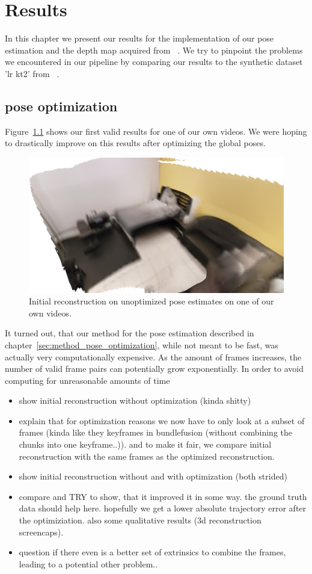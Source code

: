 \chapter{Results}
    In this chapter we present our results for the implementation of our pose estimation and the depth map acquired from ~\cite{luo2020consistent}.
    We try to pinpoint the problems we encountered in our pipeline by comparing our results to the synthetic dataset 'lr kt2' from ~\cite{handa:etal:ICRA2014}.
    \section{pose optimization}
        Figure~\ref{fig:initial_reconstruction} shows our first valid results for one of our own videos. We were hoping to drastically improve on this results after optimizing the global poses.
        \begin{figure}[ht]
            \centering
            \includegraphics[width=.6\textwidth]{images/initial_reconstruction.png}
            \caption{Initial reconstruction on unoptimized pose estimates on one of our own videos.}
            \label{fig:initial_reconstruction}
        \end{figure}
        It turned out, that our method for the pose estimation described in chapter~\ref{sec:method_pose_optimization}, while not meant to be fast, was actually very computationally expensive. As the amount of frames increases, the number of valid frame pairs can potentially grow exponentially. In order to avoid computing for unreasonable amounts of time
        \begin{itemize}
            \item show initial reconstruction without optimization (kinda shitty)
            \item explain that for optimization reasons we now have to only look at a subset of frames (kinda like they keyframes in bundlefusion (without combining the chunks into one keyframe..)). and to make it fair, we compare initial reconstruction with the same frames as the optimized reconstruction.
            \item show initial reconstruction without and with optimization (both strided)
            \item compare and TRY to show, that it improved it in some way. the ground truth data should help here. hopefully we get a lower absolute trajectory error after the optimiziation. also some qualitative results (3d reconstruction screencaps).
            \item question if there even is a better set of extrinsics to combine the frames, leading to a potential other problem..
        \end{itemize}
